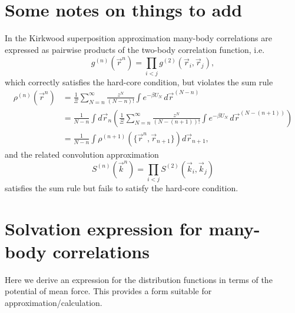 \documentclass[12pt]{report}
\begin{document}
\section{Some notes on things to add}

In the Kirkwood superposition approximation \cite{Kirkwood1935} many-body correlations are expressed as pairwise products of the two-body correlation function, i.e.
\begin{equation}
  g^{(n)}(\vec{r}^n) =
  \prod_{i < j} g^{(2)}(\vec{r}_i, \vec{r}_j),
\end{equation}
which correctly satisfies the hard-core condition, but violates the sum rule
\begin{equation}
  \begin{aligned}
    \rho^{(n)}(\vec{r}^n) &=
    \frac{1}{\Xi} \sum_{N=n}^\infty \frac{z^N}{(N-n)!} \int e^{-\beta U_N} \, d\vec{r}^{(N-n)} \\
    &=
    \frac{1}{N-n}
    \int d\vec{r}_n \left(
    \frac{1}{\Xi} \sum_{N=n}^\infty \frac{z^N}{(N-(n+1))!} \int e^{-\beta U_N} \, d\vec{r}^{(N-(n+1))}
    \right) \\
    &=
    \frac{1}{N-n}
    \int \rho^{(n+1)}(\{\vec{r}^n, \vec{r}_{n+1}\}) d\vec{r}_{n+1},
  \end{aligned}
\end{equation}
and the related convolution approximation \cite{Barrat1988}%
\begin{equation}
  S^{(n)}(\vec{k}^n) =
  \prod_{i < j} S^{(2)}(\vec{k}_i, \vec{k}_j)
\end{equation}
satisfies the sum rule but fails to satisfy the hard-core condition.


\section{Solvation expression for many-body correlations}

Here we derive an expression for the distribution functions in terms of the potential of mean force.
This provides a form suitable for approximation/calculation.
\end{document}

